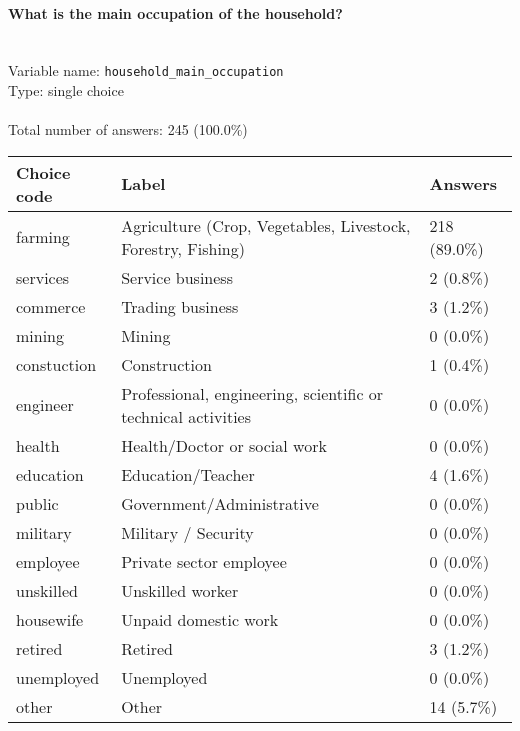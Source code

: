 \documentclass[11.5pt, a4paper]{scrartcl}
\begin{document}
\paragraph{What is the main occupation of the household?}
\  \\Variable name: \texttt{household\_main\_occupation}\\
Type: single choice\\
\\Total number of answers: 245 (100.0\%)
\\[0.2em] \begin{tabular}{p{4cm}|p{8cm}|p{3cm}}
Choice code & Label & Answers \\
\hline
farming & Agriculture (Crop, Vegetables, Livestock, Forestry, Fishing)& \cellcolor{color4}218 (89.0\%)\\
\cellcolor{mygray} services & \cellcolor{mygray}Service business & \cellcolor{color0}2 (0.8\%)\\
commerce & Trading business& \cellcolor{color0}3 (1.2\%)\\
\cellcolor{mygray} mining & \cellcolor{mygray}Mining & \cellcolor{color0}0 (0.0\%)\\
constuction & Construction& \cellcolor{color0}1 (0.4\%)\\
\cellcolor{mygray} engineer & \cellcolor{mygray}Professional, engineering, scientific or technical activities & \cellcolor{color0}0 (0.0\%)\\
health & Health/Doctor or social work& \cellcolor{color0}0 (0.0\%)\\
\cellcolor{mygray} education & \cellcolor{mygray}Education/Teacher & \cellcolor{color0}4 (1.6\%)\\
public & Government/Administrative& \cellcolor{color0}0 (0.0\%)\\
\cellcolor{mygray} military & \cellcolor{mygray}Military / Security & \cellcolor{color0}0 (0.0\%)\\
employee & Private sector employee& \cellcolor{color0}0 (0.0\%)\\
\cellcolor{mygray} unskilled & \cellcolor{mygray}Unskilled worker & \cellcolor{color0}0 (0.0\%)\\
housewife & Unpaid domestic work& \cellcolor{color0}0 (0.0\%)\\
\cellcolor{mygray} retired & \cellcolor{mygray}Retired & \cellcolor{color0}3 (1.2\%)\\
unemployed & Unemployed& \cellcolor{color0}0 (0.0\%)\\
\cellcolor{mygray} other & \cellcolor{mygray}Other & \cellcolor{color0}14 (5.7\%)\\
\end{tabular}
\end{document}
